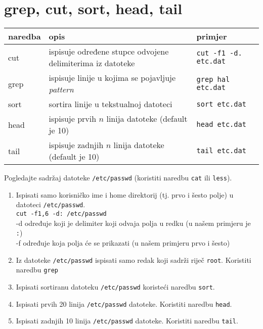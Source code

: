 \section*{grep, cut, sort, head, tail}
\begin{tabularx}{\textwidth}{lXl} 
\hline 
naredba & opis & primjer\\
\hline
cut & ispisuje određene stupce odvojene delimiterima iz datoteke &\lstinline!cut -f1 -d. etc.dat!\\
grep & ispisuje linije u kojima se pojavljuje \textit{pattern} & \lstinline!grep hal etc.dat!\\
sort & sortira linije u tekstualnoj datoteci & \lstinline!sort etc.dat!\\
head & ispisuje prvih $n$ linija datoteke (default je 10) & \lstinline!head etc.dat!\\
tail & ispisuje zadnjih $n$ linija datoteke (default je 10) & \lstinline!tail etc.dat!
\\ \hline
\end{tabularx}
\begin{zadatak} Pogledajte sadržaj datoteke \texttt{/etc/passwd} (koristiti naredbu \texttt{cat} ili \texttt{less}).


\begin{enumerate}

\item Ispisati samo korisničko ime i home direktorij (tj. prvo i šesto polje) u datoteci \texttt{/etc/passwd}.\\
 \lstinline!cut -f1,6 -d: /etc/passwd!\\
-d određuje koji je delimiter koji odvaja polja u redku (u našem primjeru je \lstinline!:!)\\
-f određuje koja polja će se prikazati (u našem primjeru prvo i šesto)
\item Iz datoteke \texttt{/etc/passwd} ispisati samo redak koji sadrži riječ \texttt{root}. Koristiti naredbu \texttt{grep}
\item Ispisati sortiranu datoteku \texttt{/etc/passwd} koristeći naredbu \texttt{sort}.
\item Ispisati prvih 20 linija \texttt{/etc/passwd} datoteke. Koristiti naredbu \texttt{head}.
\item Ispisati zadnjih 10 linija \texttt{/etc/passwd} datoteke. Koristiti naredbu \texttt{tail}.

\end{enumerate}
\end{zadatak}
